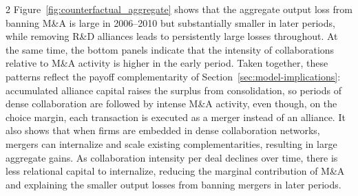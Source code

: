 \documentclass[12pt]{article}
\begin{document}
\begin{spacing}{2}
Figure~\ref{fig:counterfactual_aggregate} shows that the aggregate output loss from banning M\&A is large in 2006--2010 but substantially smaller in later periods, while removing R\&D alliances leads to persistently large losses throughout. At the same time, the bottom panels indicate that the intensity of collaborations relative to M\&A activity is higher in the early period. Taken together, these patterns reflect the payoff complementarity of Section~\ref{sec:model-implications}: accumulated alliance capital raises the surplus from consolidation, so periods of dense collaboration are followed by intense M\&A activity, even though, on the choice margin, each transaction is executed as a merger instead of an alliance. It also shows that when firms are embedded in dense collaboration networks, mergers can internalize and scale existing complementarities, resulting in large aggregate gains. As collaboration intensity per deal declines over time, there is less relational capital to internalize, reducing the marginal contribution of M\&A and explaining the smaller output losses from banning mergers in later periods.


\end{spacing}
\end{document}

